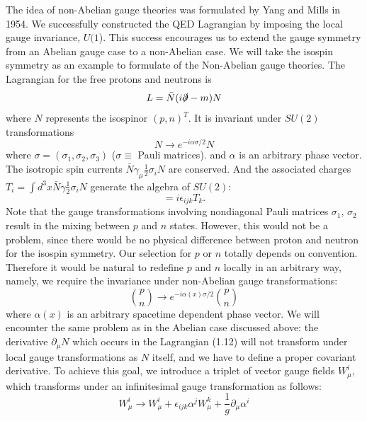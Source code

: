 The idea of non-Abelian gauge theories was formulated by Yang and Mills\cite{YM1954} in 1954. We successfully constructed the QED Lagrangian by imposing the local gauge invariance, $U(1$). This success encourages us to extend the gauge symmetry from an Abelian gauge case to a non-Abelian case. We will take the isospin symmetry as an example to formulate of the Non-Abelian gauge theories. The Lagrangian for the free protons and neutrons is 
\begin{equation}
L=\bar{N}(i\slashed{\partial}-m)N
\end{equation}
where $N$ represents the isospinor $(p,n)^T$. It is invariant under $SU(2)$ transformations
\begin{equation}
N\to e^{-i\alpha\sigma/2}N
\end{equation}
where $\sigma=(\sigma_1,\sigma_2,\sigma_3)$ ($\sigma\equiv$ Pauli matrices). and $\alpha$ is an arbitrary phase vector. The isotropic spin currents $\bar{N}\gamma_\mu\frac{1}{2}\sigma_iN$ are conserved. And the associated charges $T_i = \int d^3x \bar{N}\gamma\frac{1}{2}\sigma_iN$ generate the algebra of $SU(2)$:
\begin{equation}
[T_i, T_j] = i\epsilon_{ijk}T_k.
\end{equation} 
Note that the gauge transformations involving nondiagonal Pauli matrices $\sigma_1$, $\sigma_2$ result in the mixing between $p$ and $n$ states. However, this would not be a problem, since there would be no physical difference between proton and neutron for the isospin symmetry. Our selection for $p$ or $n$ totally depends on convention. Therefore it would be natural to redefine $p$ and $n$ locally in an arbitrary way, namely, we require the invariance under non-Abelian gauge transformations:
\begin{equation}
\binom{p}{n}\to e^{-i\alpha(x)\sigma/2}\binom{p}{n}
\end{equation} 
where $\alpha(x)$ is an arbitrary spacetime dependent phase vector. We will encounter the same problem as in the Abelian case discussed above: the derivative $\partial_\mu N$ which occurs in the Lagrangian (1.12) will not transform under local gauge transformations as $N$ itself, and we have to define a proper covariant derivative. To achieve this goal, we introduce a triplet of vector gauge fields $W_\mu^i$, which transforms under an infinitesimal gauge transformation as follows:
\begin{equation}
W_\mu^i\to W_\mu^i + \epsilon_{ijk}\alpha^j W_\mu^k+\frac{1}{g}\partial_\mu\alpha^i
\end{equation}
